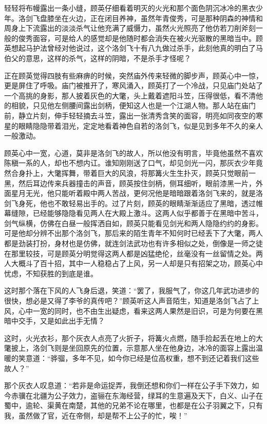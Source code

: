 轻轻将布幔露出一条小缝，顾英仔细看着明灭的火光和那个面色阴沉冰冷的黑衣少年。洛剑飞盘膝坐在火边，正在闭目养神，虽然年青俊秀，可是那种阴森的神情和周身上下流露出的淡淡杀气让他充满了威慑力，虽然火光照亮了他仿若刀削斧刻一般的俊秀面容，可是给人的感觉却是他随时都会消失在被火光驱散的黑暗当中。顾英想起马护法曾经对他说过，这个洛剑飞十有八九做过杀手，此刻他真的明白了马伯父的意思，这样的杀气，这样的阴暗，不是杀手才怪呢？

正在顾英觉得四肢有些麻痹的时候，突然庙外传来轻微的脚步声，顾英心中一惊，更是屏住了呼吸。庙门被推开了，寒风涌入，顾英打了一个冷战，只见庙门处站了一个高挑的身影，那人披着灰色的大氅，头上戴着遮阳斗笠，压得很低，看不清他的相貌，只见他左侧腰间露出剑柄，便知这人也是一个江湖人物。那人站在庙门前，静立片刻，伸手轻轻摘去斗笠，露出一张清秀含笑的面容，明亮如同夜空的寒星的眼睛隐隐带着泪光，定定地看着神色自若的洛剑飞，似是见到多年不久的亲人一般激动。

顾英心中一宽，心道，莫非是洛剑飞的故人，所以他没有明言，毕竟他虽然不喜欢陈稹一系的人，却也不想内讧。谁知刚刚送了口气，却见剑光一闪，那灰衣少年竟然合身扑上，大氅挥舞，带着巨大的风浪，将那篝火生生扑灭，顾英只觉眼前一黑，然后耳边传来兵器撞击的声音，顾英按住剑柄，侧耳细听，眼前漆黑一片，外面星月无光，他只能听着殿中两人苦战，更何况他是暗暗跟着洛剑飞来的，就是洛剑飞身死，他也不敢轻易出手的。过了片刻，顾英的眼睛渐渐适应了黑暗，透过帷幕缝隙，已经能够隐隐看见两人在大殿上激斗。这两人似乎都善于在黑暗中苦斗，剑气纵横，仿佛在白昼一般挥洒自如，顾英只能看见剑光和两人隐隐约约的身影。可是他却分辨不出那个洛剑飞，那后来的陌生青年不知何时已经丢下了大氅，两人都是劲装打扮，身材也是仿佛，就连剑法武功也有许多相似之处，倒像是一师之徒在那里较技，可是顾英分明觉得这两人都是凶猛绝伦，丝毫没有一丝留情之处。两人大概斗了百十招，其中一人稳稳占了上风，另一人却是只有招架之功，顾英心中忧虑，不知获胜的到底是谁。

这时那个落在下风的人飞身后退，笑道：“罢了，我服气了，你这几年武功进步的很快，想必是又得了李爷的真传吧？”顾英听这人声音陌生，知道是洛剑飞占了上风，心中一宽的同时，也不由生出疑虑，看来这两人果然是旧识，可是为何要在黑暗中交手，又是如此出手无情？

这时，火光衣衫，那个灰衣人点亮了火折子，将篝火点燃，随手捡起丢在地上的大氅披上，洛剑飞则是坐回原先的位置，示意那人坐在他身边，冰冷的面容上露出温暖的笑意道：“骅骝，多年不见，如今你已经是位高权重，想不到还记着我们这些故人？”

那个灰衣人叹息道：“若非是命运捉弄，我倒还想和你们一样在公子手下效力，如今赤骥在北疆为公子效力，盗骊在东海经营，绿耳的生意遍及天下，白义、山子在蜀中，逾轮、渠黄在南楚，其他的兄弟不论在哪里，也都是在公子羽翼之下，只有我，虽然做了官，近在帝侧，却是帮不上公子的忙，唉！”

